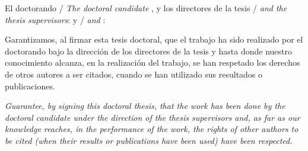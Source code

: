 \thispagestyle{empty}



El doctorando / \textit{The doctoral candidate} \textbf\thesisName, y los directores de la tesis / \textit{and the thesis supervisors}: \textbf{\thesisFirstSupervisor} y / \textit{and} \textbf\thesisSecondSupervisor:

Garantizamos, al firmar esta tesis doctoral, que el trabajo ha sido realizado por el doctorando bajo la dirección de los directores de la tesis y hasta donde nuestro conocimiento alcanza, en la realización del trabajo, se han respetado los derechos de otros autores a ser citados, cuando se han utilizado sus resultados o publicaciones.

\textit{Guarantee, by signing this doctoral thesis, that the work has been done by the doctoral candidate under the direction of the thesis supervisors and, as far as our knowledge reaches, in the performance of the work, the rights of other authors to be cited (when their results or publications have been used) have been respected.}

